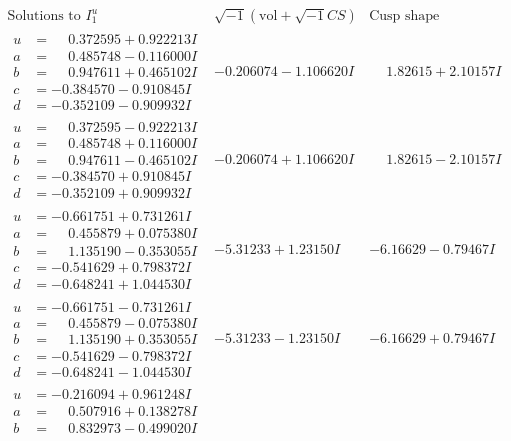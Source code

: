 \documentclass[1p]{elsarticle_modified}
\theoremstyle{definition}
\newcommand{\I}{\sqrt{-1}}
\begin{document}
$$\begin{array}{c|c|c}  
\text{Solutions to }I^u_{1}& \I (\text{vol} + \sqrt{-1}CS) & \text{Cusp shape}\\
 \hline 
\begin{aligned}
u &= \phantom{-}0.372595 + 0.922213 I \\
a &= \phantom{-}0.485748 - 0.116000 I \\
b &= \phantom{-}0.947611 + 0.465102 I \\
c &= -0.384570 - 0.910845 I \\
d &= -0.352109 - 0.909932 I\end{aligned}
 & -0.206074 - 1.106620 I & \phantom{-}1.82615 + 2.10157 I \\ \hline\begin{aligned}
u &= \phantom{-}0.372595 - 0.922213 I \\
a &= \phantom{-}0.485748 + 0.116000 I \\
b &= \phantom{-}0.947611 - 0.465102 I \\
c &= -0.384570 + 0.910845 I \\
d &= -0.352109 + 0.909932 I\end{aligned}
 & -0.206074 + 1.106620 I & \phantom{-}1.82615 - 2.10157 I \\ \hline\begin{aligned}
u &= -0.661751 + 0.731261 I \\
a &= \phantom{-}0.455879 + 0.075380 I \\
b &= \phantom{-}1.135190 - 0.353055 I \\
c &= -0.541629 + 0.798372 I \\
d &= -0.648241 + 1.044530 I\end{aligned}
 & -5.31233 + 1.23150 I & -6.16629 - 0.79467 I \\ \hline\begin{aligned}
u &= -0.661751 - 0.731261 I \\
a &= \phantom{-}0.455879 - 0.075380 I \\
b &= \phantom{-}1.135190 + 0.353055 I \\
c &= -0.541629 - 0.798372 I \\
d &= -0.648241 - 1.044530 I\end{aligned}
 & -5.31233 - 1.23150 I & -6.16629 + 0.79467 I \\ \hline\begin{aligned}
u &= -0.216094 + 0.961248 I \\
a &= \phantom{-}0.507916 + 0.138278 I \\
b &= \phantom{-}0.832973 - 0.499020 I \\

\end{aligned}
\end{array}$$
\end{document}

